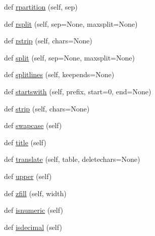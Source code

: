 \begin{DoxyCompactItemize}
\item 
def \hyperlink{classnumpy_1_1core_1_1defchararray_1_1chararray_a1733ae37a684caf05ac6442a177ccc12}{rpartition} (self, sep)
\item 
def \hyperlink{classnumpy_1_1core_1_1defchararray_1_1chararray_a5b9c5b3a32a2b0a2f9a782f206c08e96}{rsplit} (self, sep=None, maxsplit=None)
\item 
def \hyperlink{classnumpy_1_1core_1_1defchararray_1_1chararray_a91e16fcd364e57033e050cbaaefb82fa}{rstrip} (self, chars=None)
\item 
def \hyperlink{classnumpy_1_1core_1_1defchararray_1_1chararray_a163dba03d78e503f0e64484dc9b2e2ec}{split} (self, sep=None, maxsplit=None)
\item 
def \hyperlink{classnumpy_1_1core_1_1defchararray_1_1chararray_a8faa6092e9754e3b398362d4ded24949}{splitlines} (self, keepends=None)
\item 
def \hyperlink{classnumpy_1_1core_1_1defchararray_1_1chararray_ae93919492938385cb258c999d02e09f4}{startswith} (self, prefix, start=0, end=None)
\item 
def \hyperlink{classnumpy_1_1core_1_1defchararray_1_1chararray_a0db4bbb6ee6dbd1c014ce20cfab49a22}{strip} (self, chars=None)
\item 
def \hyperlink{classnumpy_1_1core_1_1defchararray_1_1chararray_ab3986a58cdd38215c6b0a3b2d75c73e1}{swapcase} (self)
\item 
def \hyperlink{classnumpy_1_1core_1_1defchararray_1_1chararray_ac980c64255b28f6529ce4d3002975ef8}{title} (self)
\item 
def \hyperlink{classnumpy_1_1core_1_1defchararray_1_1chararray_a58f77ef065a78d275b808c860d38f76d}{translate} (self, table, deletechars=None)
\item 
def \hyperlink{classnumpy_1_1core_1_1defchararray_1_1chararray_a80eb99eae67682a06ce819c116177227}{upper} (self)
\item 
def \hyperlink{classnumpy_1_1core_1_1defchararray_1_1chararray_a80c7bb46a816b9e11981159b9e3235df}{zfill} (self, width)
\item 
def \hyperlink{classnumpy_1_1core_1_1defchararray_1_1chararray_afdd86149bb138aade7f5c31fc39a7214}{isnumeric} (self)
\item 
def \hyperlink{classnumpy_1_1core_1_1defchararray_1_1chararray_a43a6a667de99eb67549f8c126d3680f7}{isdecimal} (self)
\end{DoxyCompactItemize}


